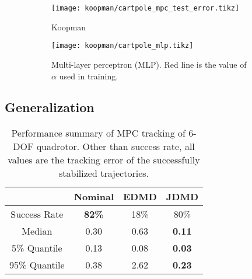 \documentclass[../root.tex]{subfiles}
\begin{document}
\begin{figure}[t]
  \centering
  \begin{subfigure}[t]{0.48\textwidth}
    \texttt{[image: koopman/cartpole\_mpc\_test\_error.tikz]}
    \caption{Koopman}
    \label{fig:cartpole_mpc_test_error}
  \end{subfigure}
  \hfill
  \begin{subfigure}[t]{0.48\textwidth}
    \texttt{[image: koopman/cartpole\_mlp.tikz]}
    \caption{Multi-layer perceptron (MLP). Red line is the value of $\alpha$ used in training.}
    \label{fig:cartpole_mlp}
  \end{subfigure}
  \caption{}
  \label{fig:sample_efficiency}
\end{figure}

\subsection{Generalization}

\begin{table}[t]
  \centering
	\begin{tabular}{cccc}\\
		\toprule  
		& {\color{black} \textbf{Nominal}} & {\color{orange} \textbf{EDMD}} & {\textbf{\color{cyan} JDMD}} \\
		\midrule
		Success Rate 		& \textbf{82\%} & 18\%	& 80\% \\
		Median      		& 0.30			& 0.63 	& \textbf{0.11} \\
            5\% Quantile        & 0.13          & 0.08 & \textbf{0.03} \\
            95\% Quantile       & 0.38          & 2.62  & \textbf{0.23} \\
		\bottomrule
	\end{tabular}
	\caption{Performance summary of MPC tracking of 6-DOF quadrotor. Other than success rate, all values are the tracking error of the successfully stabilized trajectories.}
	\label{tab:full_quad_tracking_mpc}
\end{table}
\end{document}
